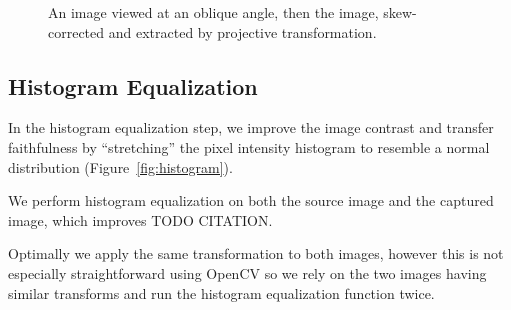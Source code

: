 \documentclass[11pt, letterpaper]{article}
\begin{document}
\begin{figure}[hbtp]
\caption{An image viewed at an oblique angle, then the image, skew-corrected and extracted by projective transformation.}
\label{fig:skew}
\end{figure}


\subsection{Histogram Equalization}
In the histogram equalization step, we improve the image contrast and transfer faithfulness by ``stretching'' the pixel intensity histogram to resemble a normal distribution (Figure~\ref{fig:histogram}).

We perform histogram equalization on both the source image and the captured image, which improves TODO CITATION.

Optimally we apply the same transformation to both images, however this is not especially straightforward using OpenCV so we rely on the two images having similar transforms and run the histogram equalization function twice.
\end{document}
